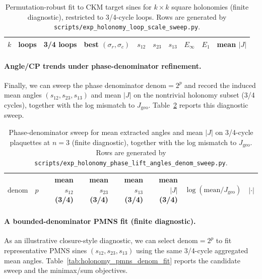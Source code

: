 \begin{table}[t]
\centering
\scriptsize
\setlength{\tabcolsep}{4pt}
\renewcommand{\arraystretch}{1.15}
\begin{tabular}{rrrrrrrrrr}
\toprule
$k$ & loops & 3/4 loops & best $(\sigma_r,\sigma_c)$ & $s_{12}$ & $s_{23}$ & $s_{13}$ & $E_\infty$ & $E_1$ & mean $|J|$ \\
\midrule
%
\end{tabular}
\caption{Permutation-robust fit to CKM target sines for $k\times k$ square holonomies (finite diagnostic), restricted to 3/4-cycle loops. Rows are generated by \texttt{scripts/exp\_holonomy\_loop\_scale\_sweep.py}.}
\label{tab:holonomy_loop_scale_fit_ckm}
\end{table}

\paragraph{Angle/CP trends under phase-denominator refinement.}
Finally, we can sweep the phase denominator $\mathrm{denom}=2^p$ and record the induced mean angles $(s_{12},s_{23},s_{13})$ and mean $|J|$ on the nontrivial holonomy subset (3/4 cycles), together with the log mismatch to $J_{\mathrm{geo}}$.
Table~\ref{tab:holonomy_phase_lift_angles_denom_sweep} reports this diagnostic sweep.

\begin{table}[t]
\centering
\scriptsize
\setlength{\tabcolsep}{6pt}
\renewcommand{\arraystretch}{1.15}
\begin{tabular}{rrrrrrrr}
\toprule
$\mathrm{denom}$ & $p$ & mean $s_{12}$ (3/4) & mean $s_{23}$ (3/4) & mean $s_{13}$ (3/4) & mean $|J|$ (3/4) & $\log(\mathrm{mean}/J_{\mathrm{geo}})$ & $|\cdot|$ \\
\midrule
%
\end{tabular}
\caption{Phase-denominator sweep for mean extracted angles and mean $|J|$ on 3/4-cycle plaquettes at $n=3$ (finite diagnostic), together with the log mismatch to $J_{\mathrm{geo}}$. Rows are generated by \texttt{scripts/exp\_holonomy\_phase\_lift\_angles\_denom\_sweep.py}.}
\label{tab:holonomy_phase_lift_angles_denom_sweep}
\end{table}

\paragraph{A bounded-denominator PMNS fit (finite diagnostic).}
As an illustrative closure-style diagnostic, we can select $\mathrm{denom}=2^p$ to fit representative PMNS sines $(s_{12},s_{23},s_{13})$ using the same 3/4-cycle aggregated mean angles.
Table~\ref{tab:holonomy_pmns_denom_fit} reports the candidate sweep and the minimax/sum objectives.

